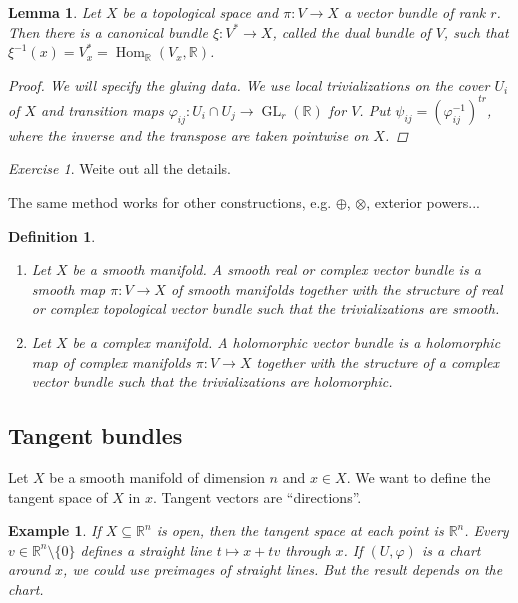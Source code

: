 \documentclass[12pt]{article}
\theoremstyle{darkgreentheorem}
\newtheorem{lm}[thm]{Lemma}
\theoremstyle{darkbluedefinition}
\newtheorem{defn}[thm]{Definition}
\theoremstyle{darkredexample}
\newtheorem{exa}[thm]{Example}
\theoremstyle{remark}
\newtheorem{exe}[thm]{Exercise}
\newcommand{\R}{\mathbb{R}}
\newcommand{\1}{\mathbbm{1}}
\DeclareMathOperator{\Hom}{Hom}
\DeclareMathOperator{\GL}{GL}
\newcommand{\ot}{\otimes}
\newcommand{\op}{\oplus}
\newcommand{\sub}{\subseteq}
\begin{document}
\begin{lm}
    Let $X$ be a topological space and $\pi\colon V\to X$ a vector bundle of rank $r$.
    Then there is a canonical bundle $\xi \colon V^{*}\to X$, called the \textit{dual bundle} of $V$, such that $\xi^{-1}(x)=V_{x}^{*}=\Hom_{\R}(V_{x},\R)$.
    \begin{proof}
	We will specify the gluing data.
	We use local trivializations on the cover $U_{i}$ of $X$ and transition maps $\varphi_{ij}\colon U_{i}\cap U_{j}\to \GL_{r}(\R)$ for $V$.
	Put $\psi_{ij}=(\varphi_{ij}^{-1})^{tr}$, where the inverse and the transpose are taken pointwise on $X$.
    \end{proof}
\end{lm}

\begin{exe}
    Weite out all the details.
\end{exe}

The same method works for other constructions, e.g. $\op$, $\ot$, exterior powers...

\begin{defn}
    \begin{enumerate}[label=\roman*)]
	\item Let $X$ be a smooth manifold.
	    A smooth real or complex vector bundle is a smooth map $\pi\colon V\to X$ of smooth manifolds together with the structure of real or complex topological vector bundle such that the trivializations are smooth.
	\item Let $X$ be a complex manifold.
	    A holomorphic vector bundle is a holomorphic map of complex manifolds $\pi \colon V\to X$ together with the structure of a complex vector bundle such that the trivializations are holomorphic.
    \end{enumerate}
\end{defn}

\subsection{Tangent bundles}

Let $X$ be a smooth manifold of dimension $n$ and $x\in X$.
We want to define the tangent space of $X$ in $x$.
Tangent vectors are ``directions''.

\begin{exa}
    If $X\sub \R^{n}$ is open, then the tangent space at each point is $\R^{n}$.
    Every $v\in \R^{n}\setminus \{ 0\}$ defines a straight line $t\mapsto x+tv$ through $x$.
    If $(U,\varphi)$ is a chart around $x$, we could use preimages of straight lines.
    But the result depends on the chart.
\end{exa}
\end{document}
